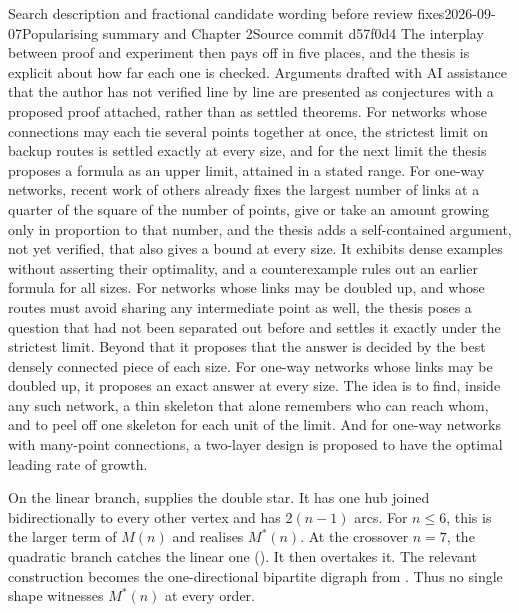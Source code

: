 \begin{offcut}{Search description and fractional candidate wording before review fixes}{2026-09-07}{Popularising summary and Chapter 2}{Source commit d57f0d4}
The interplay between proof and experiment then pays off in five places, and the thesis is explicit about how far each one is checked. Arguments drafted with AI assistance that the author has not verified line by line are presented as conjectures with a proposed proof attached, rather than as settled theorems. For networks whose connections may each tie several points together at once, the strictest limit on backup routes is settled exactly at every size, and for the next limit the thesis proposes a formula as an upper limit, attained in a stated range. For one-way networks, recent work of others already fixes the largest number of links at a quarter of the square of the number of points, give or take an amount growing only in proportion to that number, and the thesis adds a self-contained argument, not yet verified, that also gives a bound at every size. It exhibits dense examples without asserting their optimality, and a counterexample rules out an earlier formula for all sizes. For networks whose links may be doubled up, and whose routes must avoid sharing any intermediate point as well, the thesis poses a question that had not been separated out before and settles it exactly under the strictest limit. Beyond that it proposes that the answer is decided by the best densely connected piece of each size. For one-way networks whose links may be doubled up, it proposes an exact answer at every size. The idea is to find, inside any such network, a thin skeleton that alone remembers who can reach whom, and to peel off one skeleton for each unit of the limit. And for one-way networks with many-point connections, a two-layer design is proposed to have the optimal leading rate of growth.


On the linear branch,  supplies the double star.
It has one hub joined bidirectionally to every other vertex and has $2(n-1)$ arcs.
For $n\le6$, this is the larger term of $M(n)$ and realises $M^{*}(n)$.
At the crossover $n=7$, the quadratic branch catches the linear one ().
It then overtakes it.
The relevant construction becomes the one-directional bipartite digraph from .
Thus no single shape witnesses $M^{*}(n)$ at every order.

\end{offcut}

